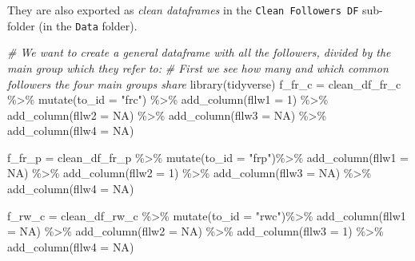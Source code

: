 \documentclass[
]{article}
\newenvironment{Shaded}{\begin{snugshade}}{\end{snugshade}}
\newcommand{\AttributeTok}[1]{\textcolor[rgb]{0.77,0.63,0.00}{#1}}
\newcommand{\CommentTok}[1]{\textcolor[rgb]{0.56,0.35,0.01}{\textit{#1}}}
\newcommand{\ConstantTok}[1]{\textcolor[rgb]{0.00,0.00,0.00}{#1}}
\newcommand{\DecValTok}[1]{\textcolor[rgb]{0.00,0.00,0.81}{#1}}
\newcommand{\FunctionTok}[1]{\textcolor[rgb]{0.00,0.00,0.00}{#1}}
\newcommand{\NormalTok}[1]{#1}
\newcommand{\OtherTok}[1]{\textcolor[rgb]{0.56,0.35,0.01}{#1}}
\newcommand{\SpecialCharTok}[1]{\textcolor[rgb]{0.00,0.00,0.00}{#1}}
\newcommand{\StringTok}[1]{\textcolor[rgb]{0.31,0.60,0.02}{#1}}
\begin{document}
They are also exported as \emph{clean dataframes} in the
\texttt{Clean\ Followers\ DF} sub-folder (in the \texttt{Data} folder).

\begin{Shaded}
\begin{Highlighting}[]
\CommentTok{\# We want to create a general dataframe with all the followers, divided by the main group which they refer to:}
\CommentTok{\# First we see how many and which common followers the four main groups share}
\FunctionTok{library}\NormalTok{(tidyverse)}
\NormalTok{f\_fr\_c }\OtherTok{=}\NormalTok{ clean\_df\_fr\_c }\SpecialCharTok{\%\textgreater{}\%} 
  \FunctionTok{mutate}\NormalTok{(}\AttributeTok{to\_id =} \StringTok{"frc"}\NormalTok{) }\SpecialCharTok{\%\textgreater{}\%} 
  \FunctionTok{add\_column}\NormalTok{(}\AttributeTok{fllw1 =} \DecValTok{1}\NormalTok{) }\SpecialCharTok{\%\textgreater{}\%} 
  \FunctionTok{add\_column}\NormalTok{(}\AttributeTok{fllw2 =} \ConstantTok{NA}\NormalTok{) }\SpecialCharTok{\%\textgreater{}\%} 
  \FunctionTok{add\_column}\NormalTok{(}\AttributeTok{fllw3 =} \ConstantTok{NA}\NormalTok{) }\SpecialCharTok{\%\textgreater{}\%} 
  \FunctionTok{add\_column}\NormalTok{(}\AttributeTok{fllw4 =} \ConstantTok{NA}\NormalTok{)}

\NormalTok{f\_fr\_p }\OtherTok{=}\NormalTok{ clean\_df\_fr\_p }\SpecialCharTok{\%\textgreater{}\%} 
  \FunctionTok{mutate}\NormalTok{(}\AttributeTok{to\_id =} \StringTok{"frp"}\NormalTok{)}\SpecialCharTok{\%\textgreater{}\%} 
  \FunctionTok{add\_column}\NormalTok{(}\AttributeTok{fllw1 =} \ConstantTok{NA}\NormalTok{) }\SpecialCharTok{\%\textgreater{}\%} 
  \FunctionTok{add\_column}\NormalTok{(}\AttributeTok{fllw2 =} \DecValTok{1}\NormalTok{) }\SpecialCharTok{\%\textgreater{}\%} 
  \FunctionTok{add\_column}\NormalTok{(}\AttributeTok{fllw3 =} \ConstantTok{NA}\NormalTok{) }\SpecialCharTok{\%\textgreater{}\%} 
  \FunctionTok{add\_column}\NormalTok{(}\AttributeTok{fllw4 =} \ConstantTok{NA}\NormalTok{)}

\NormalTok{f\_rw\_c }\OtherTok{=}\NormalTok{ clean\_df\_rw\_c }\SpecialCharTok{\%\textgreater{}\%} 
  \FunctionTok{mutate}\NormalTok{(}\AttributeTok{to\_id =} \StringTok{"rwc"}\NormalTok{)}\SpecialCharTok{\%\textgreater{}\%} 
  \FunctionTok{add\_column}\NormalTok{(}\AttributeTok{fllw1 =} \ConstantTok{NA}\NormalTok{) }\SpecialCharTok{\%\textgreater{}\%} 
  \FunctionTok{add\_column}\NormalTok{(}\AttributeTok{fllw2 =} \ConstantTok{NA}\NormalTok{) }\SpecialCharTok{\%\textgreater{}\%} 
  \FunctionTok{add\_column}\NormalTok{(}\AttributeTok{fllw3 =} \DecValTok{1}\NormalTok{) }\SpecialCharTok{\%\textgreater{}\%} 
  \FunctionTok{add\_column}\NormalTok{(}\AttributeTok{fllw4 =} \ConstantTok{NA}\NormalTok{)}


\end{Highlighting}
\end{Shaded}
\end{document}
